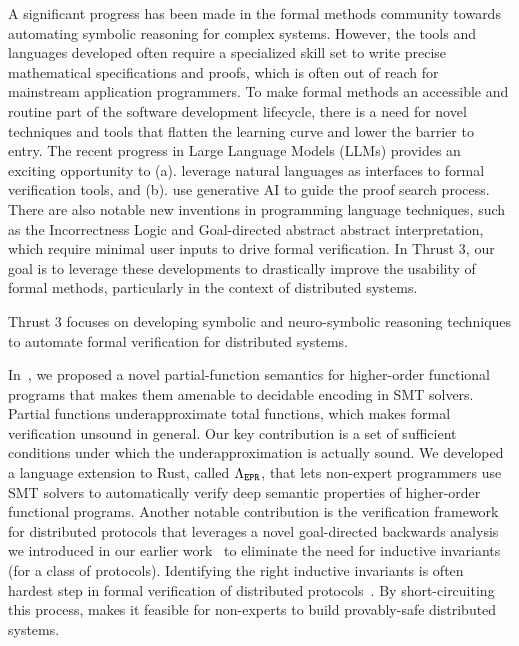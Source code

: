 A  significant progress has been made in the formal methods community
towards automating symbolic reasoning for complex systems. However, the
tools and languages developed often require a specialized skill set to
write precise mathematical specifications and proofs, which is often out of
reach for mainstream application programmers. To make formal methods an
accessible and routine part of the software development lifecycle, there is
a need for novel techniques and tools that flatten the learning curve and
lower the barrier to entry. The recent progress in Large Language Models
(LLMs) provides an exciting opportunity to (a). leverage natural languages
as interfaces to formal verification tools, and (b). use generative AI to
guide the proof search process. There are also notable new inventions in
programming language techniques, such as the Incorrectness Logic and
Goal-directed abstract abstract interpretation, which require minimal user
inputs to drive formal verification. In Thrust 3, our goal is to leverage
these developments to drastically improve the usability of formal methods,
particularly in the context of distributed systems. 
\begin{mdquote}
Thrust 3 focuses on developing symbolic and neuro-symbolic reasoning
techniques to automate formal verification for distributed systems. 
\end{mdquote}

 In~\cite{lewchenko-oopsla26}, we
proposed a novel partial-function semantics for higher-order functional
programs that makes them amenable to decidable encoding in SMT solvers.
Partial functions underapproximate total functions, which makes formal
verification unsound in general. Our key contribution is a set of
sufficient conditions under which the underapproximation is actually sound.
We developed a language extension to Rust, called $\Lambda_{\texttt{EPR}}$, that lets
non-expert programmers use SMT solvers to automatically verify deep
semantic properties of higher-order functional programs. Another notable
contribution is the \dissprove verification
framework~\cite{fontenot-dissprove} for distributed protocols that
leverages a novel goal-directed backwards analysis we introduced in our
earlier work~\cite{meier-oopsla23} to eliminate the need for inductive
invariants (for a class of protocols). Identifying the right inductive
invariants is often hardest step in formal verification of distributed
protocols~\cite{ivy2016}. By short-circuiting this process, \dissprove
makes it feasible for non-experts to build provably-safe distributed
systems.

